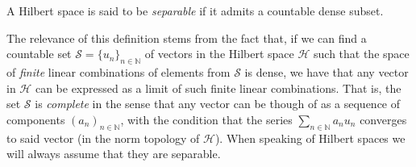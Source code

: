 \begin{definition}
	A Hilbert space is said to be \textit{separable} if it admits a countable dense subset.
\end{definition}

The relevance of this definition stems from the fact that, if we can find a countable set
$\mathcal{S} = \{u_n\}_{n\in\mathbb{N}}$ of vectors in the Hilbert space $\mathcal{H}$ such that
the space of \textit{finite} linear combinations of elements from $\mathcal{S}$ is dense, we
have that any vector in $\mathcal{H}$ can be expressed as a limit of such finite linear
combinations. That is, the set $\mathcal{S}$ is \textit{complete} in the sense that any vector
can be though of as a sequence of components $(a_n)_{n\in\mathbb{N}}$, with the condition that
the series $\sum_{n\in\mathbb{N}}a_n u_n$ converges to said vector (in the norm topology of
$\mathcal{H}$). When speaking of Hilbert spaces we will always assume that they are separable.

